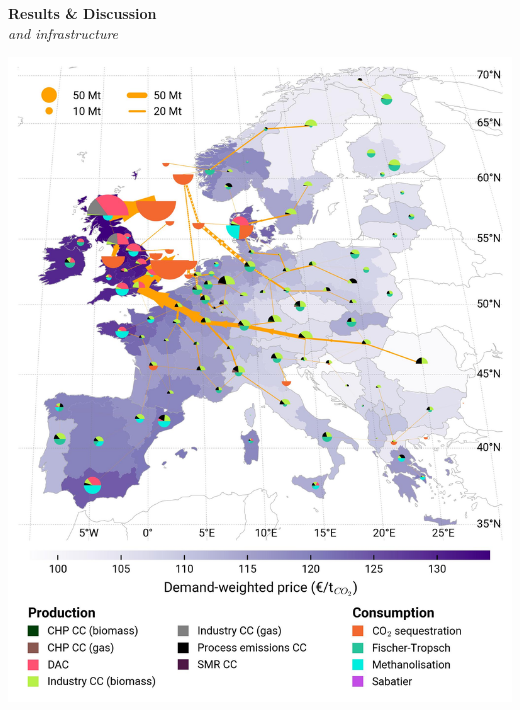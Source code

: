 \documentclass[a0,portrait]{a0poster}
\begin{document}
\begin{multicols}{3}
\columnbreak

\noindent \textcolor{red100}{\huge \textbf{Results \& Discussion}}
\\
\textit{ and  infrastructure}
\\

\begin{center}
    \includegraphics[width=\linewidth]{base_s_adm___2050-balance_map_co2_stored.jpg}
    \label{fig:PCI-in_lt_2050_co2}
\end{center}
\vspace{2em}
\begin{center}

\end{center}
\end{multicols}
\end{document}
